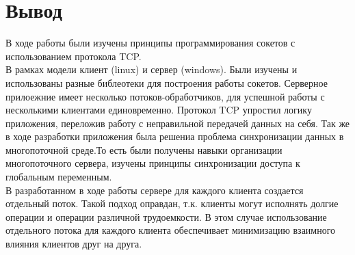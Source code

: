 \documentclass[a4paper,14pt]{article}
\begin{document}
\section{Вывод}
В ходе работы были изучены принципы программирования сокетов с использованием протокола TCP.\\
В рамках модели клиент (linux) и сервер (windows). Были изучены и использованы разные библеотеки для построения работы сокетов. Серверное прилоежние имеет несколько потоков-обработчиков, для успешной работы с несколькими клиентами единовременно. Протокол TCP упростил логику приложения, переложив работу с неправильной передачей данных на себя. 
Так же в ходе разработки приложения была решениа проблема синхронизации данных в многопоточной среде.То есть были получены навыки организации многопоточного сервера, изучены принципы синхронизации доступа к глобальным переменным.\\
В разработанном в ходе работы сервере для каждого клиента создается отдельный поток. Такой подход оправдан, т.к. клиенты могут исполнять долгие операции и операции различной трудоемкости. В этом случае использование отдельного потока для каждого клиента обеспечивает минимизацию взаимного влияния клиентов друг на друга.  \\\\
\end{document}
